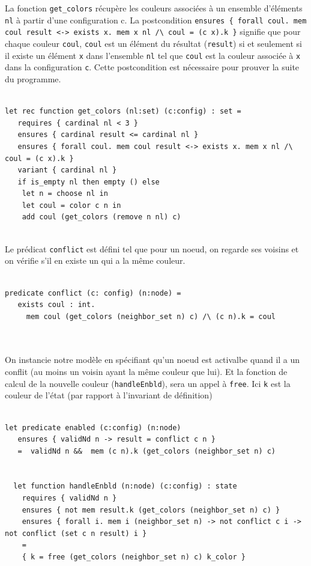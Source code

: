 \documentclass[11pt]{article}
\begin{document}
La fonction \texttt{get\_colors} récupère les couleurs associées à un ensemble d'éléments \texttt{nl} à partir d'une configuration c. 
La postcondition \texttt{ensures \{ forall coul. mem coul result <-> exists x. mem x nl /\textbackslash{} coul = (c x).k \}} signifie
que pour chaque couleur \texttt{coul}, \texttt{coul} est un élément du résultat (\texttt{result}) si et seulement si 
il existe un élément \texttt{x} dans l'ensemble \texttt{nl} tel que \texttt{coul} est la couleur associée à \texttt{x} dans la configuration \texttt{c}.
Cette postcondition est nécessaire pour prouver la suite du programme.

\lstset{language=why3,label= ,caption= ,captionpos=b,numbers=none}
\begin{lstlisting}

let rec function get_colors (nl:set) (c:config) : set =
   requires { cardinal nl < 3 }
   ensures { cardinal result <= cardinal nl }
   ensures { forall coul. mem coul result <-> exists x. mem x nl /\ coul = (c x).k }
   variant { cardinal nl }
   if is_empty nl then empty () else
    let n = choose nl in
    let coul = color c n in
    add coul (get_colors (remove n nl) c)


\end{lstlisting}

Le prédicat \texttt{conflict} est défini tel que pour un noeud, on regarde ses voisins et on vérifie s'il en existe un qui a la même couleur.

\lstset{language=why3,label= ,caption= ,captionpos=b,numbers=none}
\begin{lstlisting}

predicate conflict (c: config) (n:node) =
   exists coul : int.
     mem coul (get_colors (neighbor_set n) c) /\ (c n).k = coul



\end{lstlisting}

On instancie notre modèle en spécifiant qu'un noeud est activalbe quand il a un conflit (au moins un voisin ayant la même couleur que lui).
Et la fonction de calcul de la nouvelle couleur (\texttt{handleEnbld}), sera un appel à \texttt{free}. 
Ici \texttt{k} est la couleur de l'état (par rapport à l'invariant de définition)

\lstset{language=why3,label= ,caption= ,captionpos=b,numbers=none}
\begin{lstlisting}

let predicate enabled (c:config) (n:node)
   ensures { validNd n -> result = conflict c n }
   =  validNd n &&  mem (c n).k (get_colors (neighbor_set n) c)


  let function handleEnbld (n:node) (c:config) : state
    requires { validNd n }
    ensures { not mem result.k (get_colors (neighbor_set n) c) }
    ensures { forall i. mem i (neighbor_set n) -> not conflict c i -> not conflict (set c n result) i }
    =
    { k = free (get_colors (neighbor_set n) c) k_color }

\end{lstlisting}
\end{document}
